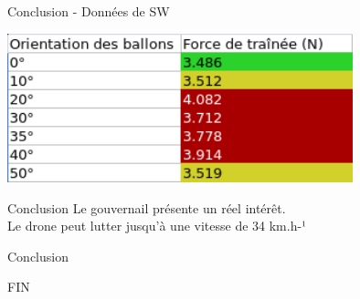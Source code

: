 \begin{frame}{Conclusion - Données de SW}
	\begin{center}
    \includegraphics[width=10cm]{../Images/resultatsSW.png} \\
	\end{center}
\end{frame}

\begin{frame}{Conclusion}
  Le gouvernail présente un réel intérêt.\\
  Le drone peut lutter jusqu'à une vitesse de 34 km.h-¹
\end{frame}

\begin{frame}{Conclusion}
  \begin{center}
  FIN
  \end{center}
\end{frame}


